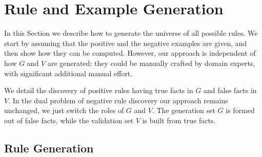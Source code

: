 \section{\hspace{-1.5ex} Rule and Example Generation} \label{sec:rules_gen}
In this Section we describe how to generate the universe of all possible rules. 
We start by assuming that the positive and the negative examples are given, and then show how they can be computed. However, our approach is independent of how $G$ and $V$ are generated: they could be manually crafted by domain experts, with significant additional manual effort.

We detail the discovery of positive rules having true facts in $G$ and false facts in $V$.
In the dual problem of negative rule discovery our approach remains unchanged, we just switch the roles of $G$ and $V$. The generation set $G$ is formed out of false facts, while the validation set $V$ is built from true facts. 


\vspace{-1ex}	
\subsection{Rule Generation} \label{sec:rules_generation}
\vspace{-0.2ex}	

